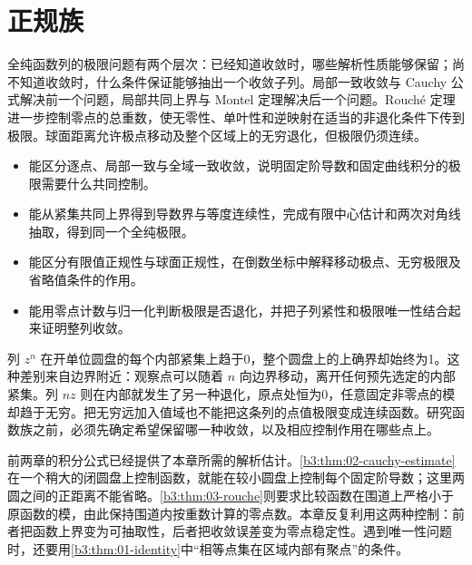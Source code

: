\chapter{正规族}
\label{b3:ch:04}
\begin{chapterabstract}
全纯函数列的极限问题有两个层次：已经知道收敛时，哪些解析性质能够保留；尚不知道收敛时，什么条件保证能够抽出一个收敛子列。局部一致收敛与 Cauchy 公式解决前一个问题，局部共同上界与 Montel 定理解决后一个问题。Rouché 定理进一步控制零点的总重数，使无零性、单叶性和逆映射在适当的非退化条件下传到极限。球面距离允许极点移动及整个区域上的无穷退化，但极限仍须连续。
\end{chapterabstract}

\begin{learninggoals}
\begin{itemize}
\item\label{b3:item:04-goal-1}能区分逐点、局部一致与全域一致收敛，说明固定阶导数和固定曲线积分的极限需要什么共同控制。
\item\label{b3:item:04-goal-2}能从紧集共同上界得到导数界与等度连续性，完成有限中心估计和两次对角线抽取，得到同一个全纯极限。
\item\label{b3:item:04-goal-3}能区分有限值正规性与球面正规性，在倒数坐标中解释移动极点、无穷极限及省略值条件的作用。
\item\label{b3:item:04-goal-4}能用零点计数与归一化判断极限是否退化，并把子列紧性和极限唯一性结合起来证明整列收敛。
\end{itemize}
\end{learninggoals}

列 \(z^n\) 在开单位圆盘的每个内部紧集上趋于0，整个圆盘上的上确界却始终为1。这种差别来自边界附近：观察点可以随着 \(n\) 向边界移动，离开任何预先选定的内部紧集。列 \(nz\) 则在内部就发生了另一种退化，原点处恒为0，任意固定非零点的模却趋于无穷。把无穷远加入值域也不能把这条列的点值极限变成连续函数。研究函数族之前，必须先确定希望保留哪一种收敛，以及相应控制作用在哪些点上。

\ProseParagraphBreak

前两章的积分公式已经提供了本章所需的解析估计。\cref{b3:thm:02-cauchy-estimate}在一个稍大的闭圆盘上控制函数，就能在较小圆盘上控制每个固定阶导数；这里两圆之间的正距离不能省略。\cref{b3:thm:03-rouche}则要求比较函数在围道上严格小于原函数的模，由此保持围道内按重数计算的零点数。本章反复利用这两种控制：前者把函数上界变为可抽取性，后者把收敛误差变为零点稳定性。遇到唯一性问题时，还要用\cref{b3:thm:01-identity}中“相等点集在区域内部有聚点”的条件。

